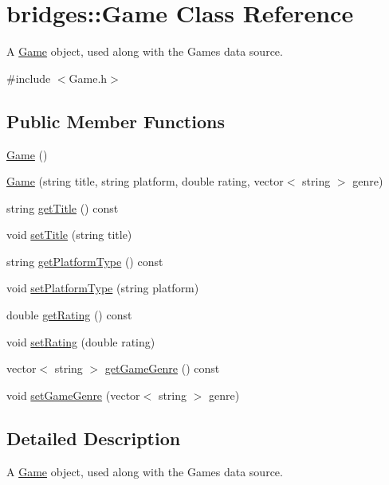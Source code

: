 \hypertarget{classbridges_1_1_game}{}\section{bridges\+:\+:Game Class Reference}
\label{classbridges_1_1_game}


A \hyperlink{classbridges_1_1_game}{Game} object, used along with the Games data source.  




{\ttfamily \#include $<$Game.\+h$>$}

\subsection*{Public Member Functions}
\begin{DoxyCompactItemize}
\item 
\hyperlink{classbridges_1_1_game_a44f625a03ebf144931aa9e7e5440303c}{Game} ()
\item 
\hyperlink{classbridges_1_1_game_ab8064a35bca85871e7088f351ce86af1}{Game} (string title, string platform, double rating, vector$<$ string $>$ genre)
\item 
string \hyperlink{classbridges_1_1_game_a49e334cab245cbc5460806bfed18b279}{get\+Title} () const 
\item 
void \hyperlink{classbridges_1_1_game_a6cfbd26183eb1202ea29b9f005dfb76b}{set\+Title} (string title)
\item 
string \hyperlink{classbridges_1_1_game_a1fa96763c44813f3a0b5a24db3df4d94}{get\+Platform\+Type} () const 
\item 
void \hyperlink{classbridges_1_1_game_a30d2c5800f2f3696162f5a3295325a3e}{set\+Platform\+Type} (string platform)
\item 
double \hyperlink{classbridges_1_1_game_ac6c8dfe00d817c860566dd92984adf82}{get\+Rating} () const 
\item 
void \hyperlink{classbridges_1_1_game_a0b9b3180975b2d3028b9090559bb6624}{set\+Rating} (double rating)
\item 
vector$<$ string $>$ \hyperlink{classbridges_1_1_game_abe17f8063757d73be3d5b1a91c262c80}{get\+Game\+Genre} () const 
\item 
void \hyperlink{classbridges_1_1_game_a973e89486663131ab9095c93d4d62e81}{set\+Game\+Genre} (vector$<$ string $>$ genre)
\end{DoxyCompactItemize}


\subsection{Detailed Description}
A \hyperlink{classbridges_1_1_game}{Game} object, used along with the Games data source. 

